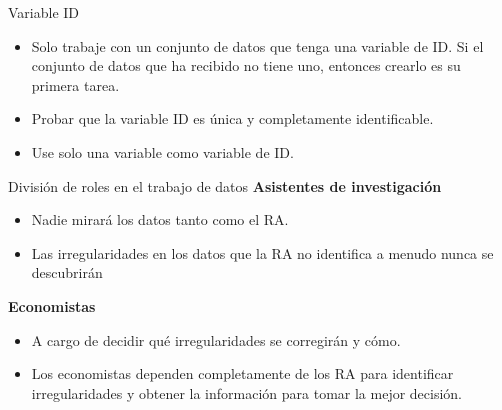 \documentclass[11pt, aspectratio=169, compress]{beamer}
\begin{document}
\begin{frame}{Variable ID}
	\begin{itemize}
		\item Solo trabaje con un conjunto de datos que tenga una variable de ID. Si el conjunto de datos que ha recibido no tiene uno, entonces crearlo es su primera tarea.
		\item Probar que la variable ID es única y completamente identificable.
		\item Use solo una variable como variable de ID.
	\end{itemize}
\end{frame}
\begin{frame}{División de roles en el trabajo de datos}
	\textbf{Asistentes de investigación}
	\begin{itemize}
		\item Nadie mirará los datos tanto como el RA.
		\item Las irregularidades en los datos que la RA no identifica a menudo nunca se descubrirán
	\end{itemize}
	\textbf{Economistas}
	\begin{itemize}
		\item A cargo de decidir qué irregularidades se corregirán y cómo.
		\item Los economistas dependen completamente de los RA para identificar irregularidades y obtener la información para tomar la mejor decisión.
	\end{itemize}
\end{frame}
\end{document}

